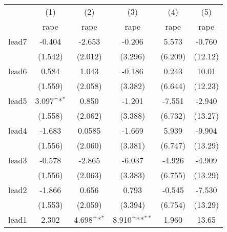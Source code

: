 {
\def\sym#1{\ifmmode^{#1}\else\(^{#1}\)\fi}
\begin{tabular}{l*{5}{c}}
\hline\hline
            &\multicolumn{1}{c}{(1)}&\multicolumn{1}{c}{(2)}&\multicolumn{1}{c}{(3)}&\multicolumn{1}{c}{(4)}&\multicolumn{1}{c}{(5)}\\
            &\multicolumn{1}{c}{rape}&\multicolumn{1}{c}{rape}&\multicolumn{1}{c}{rape}&\multicolumn{1}{c}{rape}&\multicolumn{1}{c}{rape}\\
\hline
lead7       &      -0.404         &      -2.653         &      -0.206         &       5.573         &      -0.760         \\
            &     (1.542)         &     (2.012)         &     (3.296)         &     (6.209)         &     (12.12)         \\
[1em]
lead6       &       0.584         &       1.043         &      -0.186         &       0.243         &       10.01         \\
            &     (1.559)         &     (2.058)         &     (3.382)         &     (6.644)         &     (12.23)         \\
[1em]
lead5       &       3.097\sym{*}  &       0.850         &      -1.201         &      -7.551         &      -2.940         \\
            &     (1.558)         &     (2.062)         &     (3.388)         &     (6.732)         &     (13.27)         \\
[1em]
lead4       &      -1.683         &      0.0585         &      -1.669         &       5.939         &      -9.904         \\
            &     (1.556)         &     (2.060)         &     (3.381)         &     (6.747)         &     (13.29)         \\
[1em]
lead3       &      -0.578         &      -2.865         &      -6.037         &      -4.926         &      -4.909         \\
            &     (1.556)         &     (2.063)         &     (3.383)         &     (6.755)         &     (13.29)         \\
[1em]
lead2       &      -1.866         &       0.656         &       0.793         &      -0.545         &      -7.530         \\
            &     (1.553)         &     (2.059)         &     (3.394)         &     (6.754)         &     (13.29)         \\
[1em]
lead1       &       2.302         &       4.698\sym{*}  &       8.910\sym{**} &       1.960         &       13.65         \\

\end{tabular}}
